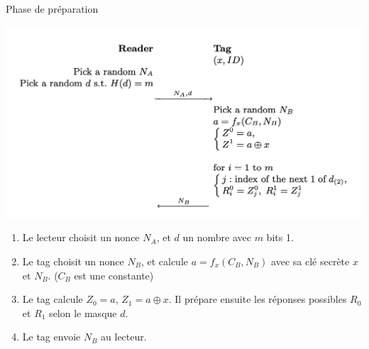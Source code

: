 \documentclass[aspectratio=169]{beamer}
\begin{document}
\begin{frame}{Phase de préparation}
    \begin{multicols}{2}
        \begin{minipage}[c]{\linewidth}
            \centering
            \bigskip
            \medskip
            \includegraphics[width=\linewidth]{../assets/sk-phase1.png}
        \end{minipage}

        \begin{minipage}[t]{\linewidth}
            \begin{enumerate}
                \item Le lecteur choisit un nonce $N_A$, et $d$ un nombre avec $m$ bits 1.
                \item Le tag choisit un nonce $N_B$, et calcule $a = f_x(C_B, N_B)$ avec sa clé secrète $x$ et $N_B$. ($C_B$ est une constante)
                \item Le tag calcule $Z_0 = a$, $Z_1 = a \oplus x$. Il prépare ensuite les réponses possibles $R_0$ et $R_1$ selon le masque $d$.
                \item Le tag envoie $N_B$ au lecteur.
            \end{enumerate}
        \end{minipage}
    \end{multicols}
\end{frame}
\end{document}
